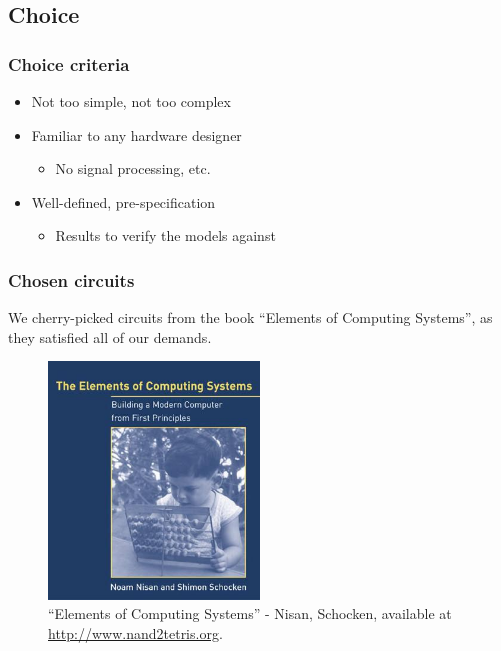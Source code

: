 \documentclass{beamer}
\begin{document}
        \subsection{Choice}
        \label{subsec:circuit-choice-criteria}
            \begin{frame}
                \frametitle{Choice criteria}

                \begin{itemize}
                    \item Not too simple, not too complex
                    \item Familiar to any hardware designer
                        \begin{itemize}
                            \item No signal processing, etc.
                        \end{itemize}
                    \item Well-defined, pre-specification
                        \begin{itemize}
                            \item Results to verify the models against
                        \end{itemize}
                \end{itemize}
            \end{frame}

            \begin{frame}
                \frametitle{Chosen circuits}

                \par{We cherry-picked circuits from the book ``Elements of Computing Systems'',
                    as they satisfied all of our demands.}

                \begin{figure}[h!]
                    \includegraphics[width=0.5\textwidth]{imgs/book-cover-elements.jpg}
                    \caption{``Elements of Computing Systems'' - Nisan, Schocken, \newline
                        available at \url{http://www.nand2tetris.org}.
                        \label{fig:book-cover-elements}
                    }
                \end{figure}
            \end{frame}
\end{document}

